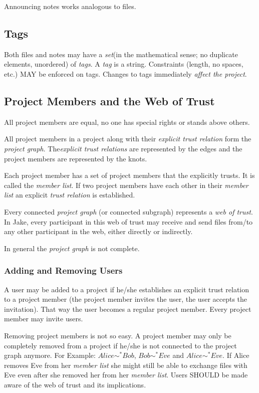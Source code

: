 Announcing notes works analogous to files.

\subsection{Tags}
Both files and notes may have a \emph{set}(in the mathematical sense; no duplicate elements, unordered) of \emph{tags}. A \emph{tag} is a string. Constraints (length, no spaces, etc.) MAY be enforced on tags. Changes to tags immediately \emph{affect the project}.

\subsection{Project Members and the Web of Trust}
All project members are equal, no one has special rights or stands above others.

All project members in a project along with their \emph{explicit trust relation} form the \emph{project graph}. The\emph{explicit trust relations} are represented by the edges and the project members are represented by the knots.

Each project member has a set of project members that the explicitly trusts. It is called the \emph{member list}. If two project members have each other in their \emph{member list} an explicit \emph{trust relation} is established. 

Every connected \emph{project graph} (or connected subgraph) represents a \emph{web of trust}. In Jake, every participant in this web of trust may receive and send files from/to any other participant in the web, either directly or indirectly.

In general the \emph{project graph} is not complete.

\subsubsection{Adding and Removing Users}
A user may be added to a project if he/she establishes an explicit trust relation to a project member (the project member invites the user, the user accepts the invitation). That way the user becomes a regular project member. Every project member may invite users. 

Removing project members is not so easy. A project member may only be completely removed from a project if he/she is not connected to the project graph anymore. For Example: $Alice \sim ^* Bob$, $Bob \sim ^* Eve$ and $Alice \sim ^* Eve$. If Alice removes Eve from her \emph{member list} she might still be able to exchange files with Eve even after she removed her from her \emph{member list}. Users SHOULD be made aware of the web of trust and its implications.

